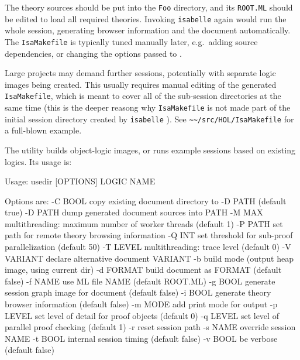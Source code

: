 \begin{isabellebody}
\begin{isamarkuptext}
  \noindent The theory sources should be put into the \verb|Foo|
  directory, and its \verb|ROOT.ML| should be edited to load all
  required theories.  Invoking \verb|isabelle| \hyperlink{tool.make}{\mbox{}} again
  would run the whole session, generating browser information and the
  document automatically.  The \verb|IsaMakefile| is typically
  tuned manually later, e.g.\ adding source dependencies, or changing
  the options passed to \hyperlink{tool.usedir}{\mbox{}}.

  \medskip Large projects may demand further sessions, potentially
  with separate logic images being created.  This usually requires
  manual editing of the generated \verb|IsaMakefile|, which is
  meant to cover all of the sub-session directories at the same time
  (this is the deeper reasong why \verb|IsaMakefile| is not made
  part of the initial session directory created by \verb|isabelle| \hyperlink{tool.mkdir}{\mbox{}}).  See \verb|~~/src/HOL/IsaMakefile| for
  a full-blown example.%
\end{isamarkuptext}%
\isamarkuptrue%
%
\isamarkuptrue%
%
\begin{isamarkuptext}%
The \hypertarget{tool.usedir}{\hyperlink{tool.usedir}{\mbox{}}} utility builds object-logic images, or runs
  example sessions based on existing logics. Its usage is:
\begin{ttbox}

Usage: usedir [OPTIONS] LOGIC NAME

  Options are:
    -C BOOL      copy existing document directory to -D PATH (default true)
    -D PATH      dump generated document sources into PATH
    -M MAX       multithreading: maximum number of worker threads (default 1)
    -P PATH      set path for remote theory browsing information
    -Q INT       set threshold for sub-proof parallelization (default 50)
    -T LEVEL     multithreading: trace level (default 0)
    -V VARIANT   declare alternative document VARIANT
    -b           build mode (output heap image, using current dir)
    -d FORMAT    build document as FORMAT (default false)
    -f NAME      use ML file NAME (default ROOT.ML)
    -g BOOL      generate session graph image for document (default false)
    -i BOOL      generate theory browser information (default false)
    -m MODE      add print mode for output
    -p LEVEL     set level of detail for proof objects (default 0)
    -q LEVEL     set level of parallel proof checking (default 1)
    -r           reset session path
    -s NAME      override session NAME
    -t BOOL      internal session timing (default false)
    -v BOOL      be verbose (default false)


\end{ttbox}
\end{isamarkuptext}
\end{isabellebody}
